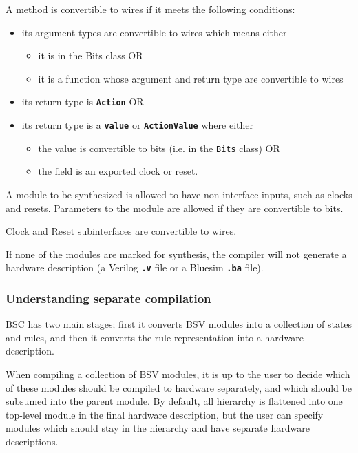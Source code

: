 \documentclass{article}
\newcommand{\te}[1]{\texttt{#1}}
\begin{document}
A method is convertible to wires if it meets the following conditions:
\begin{itemize}
\item its argument types are convertible to wires which means either
\begin{itemize}
\item it is in the {\bf\tt} Bits class OR
\item it is a function whose argument and return type are convertible
to wires
\end{itemize}
\item its return type is  {\bf\tt Action} OR
\item its return type is a
{\bf\tt value} or {\bf\tt ActionValue} where  either
\begin{itemize} \item the value is convertible
to bits (i.e. in the \te{Bits} class) OR
\item the field is an exported clock or reset.
\end{itemize}
\end{itemize}

A module to be synthesized is allowed to have non-interface inputs,
such as clocks and resets.  Parameters to the module are allowed
if they are convertible to bits.

Clock and Reset subinterfaces are convertible to wires.

If none of the  modules are marked for
synthesis, the compiler will not generate a hardware description (a
Verilog {\bf\tt .v} file  or a Bluesim {\bf\tt .ba} file).


\subsubsection{Understanding separate compilation}
\label{sep-compile}

BSC has two main stages; first it converts BSV modules
into a collection of states and rules, and then it converts the
rule-representation into a hardware description.

When compiling a collection of BSV modules, it is up to the user to
decide which of these modules should be compiled to hardware
separately, and which should be subsumed into the parent module.  By
default, all hierarchy is flattened into one top-level module in the
final hardware description, but the user can specify   modules which should
stay in the hierarchy and
have separate hardware descriptions.
\end{document}

